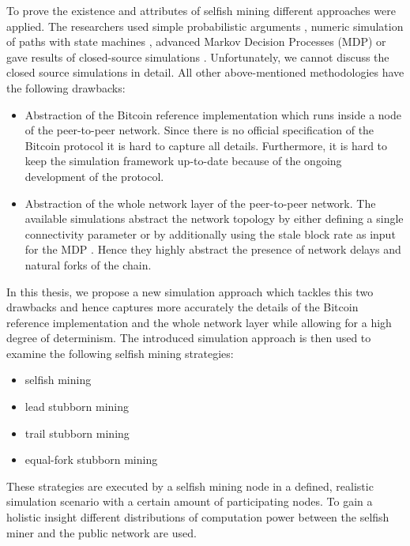 To prove the existence and attributes of selfish mining different approaches were applied.
The researchers used simple probabilistic arguments \cite{eyal2014majority, bahack2013theoretical}, numeric simulation of paths with state machines \cite{gervais2015tampering, nayak2016stubborn}, advanced Markov Decision Processes (MDP) \cite{sapirshtein2016optimal, gervais2016security} or gave results of closed-source simulations \cite{eyal2014majority, sapirshtein2016optimal}.
Unfortunately, we cannot discuss the closed source simulations in detail.
All other above-mentioned methodologies have the following drawbacks:
\begin{itemize}
\item Abstraction of the Bitcoin reference implementation which runs inside a node of the peer-to-peer network.
Since there is no official specification of the Bitcoin protocol it is hard to capture all details.
Furthermore, it is hard to keep the simulation framework up-to-date because of the ongoing development of the protocol.
\item Abstraction of the whole network layer of the peer-to-peer network.
The available simulations abstract the network topology by either defining a single connectivity parameter \cite{eyal2014majority, bahack2013theoretical, nayak2016stubborn, sapirshtein2016optimal, gervais2015tampering} or by additionally using the stale block rate as input for the MDP \cite{gervais2016security}.
Hence they highly abstract the presence of network delays and natural forks of the chain.
\end{itemize}

In this thesis, we propose a new simulation approach which tackles this two drawbacks and hence captures more accurately the details of the Bitcoin reference implementation and the whole network layer while allowing for a high degree of determinism.
The introduced simulation approach is then used to examine the following selfish mining strategies:

\begin{itemize}
\item selfish mining \cite{eyal2014majority}
\item lead stubborn mining \cite{nayak2016stubborn}
\item trail stubborn mining \cite{nayak2016stubborn}
\item equal-fork stubborn mining \cite{nayak2016stubborn}
\end{itemize}

These strategies are executed by a selfish mining node in a defined, realistic simulation scenario with a certain amount of participating nodes.
To gain a holistic insight different distributions of computation power between the selfish miner and the public network are used.

